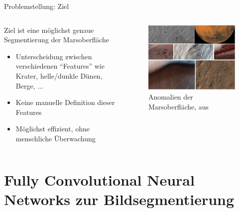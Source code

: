 \documentclass[9pt]{beamer}
\begin{document}
\begin{frame}{Problemstellung: Ziel}
\begin{columns}
	\begin{column}{.4\textwidth}
		Ziel ist eine möglichst genaue Segmentierung der Marsoberfläche
		\begin{itemize}
			\item Unterscheidung zwischen verschiedenen \enquote{Features} wie Krater, helle/dunkle Dünen, Berge, $\ldots$
			\item Keine manuelle Definition dieser Features
			\item Möglichst effizient, ohne menschliche Überwachung
		\end{itemize}
	\end{column}
	\begin{column}{.6\textwidth}
		\begin{figure}[H]
			\includegraphics[width=\textwidth, keepaspectratio]{surface.png}
			\caption{Anomalien der Marsoberfläche, aus \footnotemark[1]}
		\end{figure}
	\end{column}
\end{columns}	
\end{frame}

\section{Fully Convolutional Neural Networks zur Bildsegmentierung}
\end{document}
